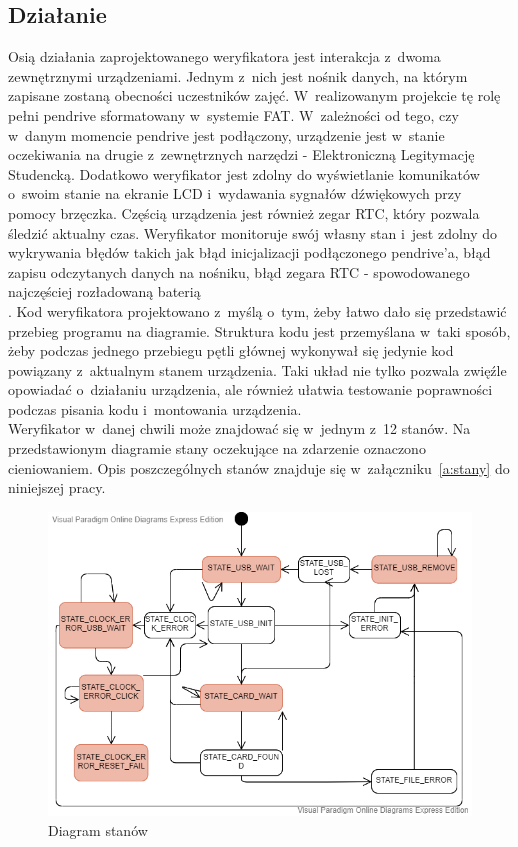 \documentclass[declaration,shortabstract, mgr]{iithesis}
\begin{document}
\subsection{Działanie}
\indent Osią działania zaprojektowanego weryfikatora jest interakcja z~dwoma zewnętrznymi urządzeniami. Jednym z~nich jest nośnik danych, na którym zapisane zostaną obecności uczestników zajęć. W~realizowanym projekcie tę rolę pełni pendrive sformatowany w~systemie FAT. W~zależności od tego, czy w~danym momencie pendrive jest podłączony, urządzenie jest w~stanie oczekiwania na drugie z~zewnętrznych narzędzi - Elektroniczną Legitymację Studencką. Dodatkowo weryfikator jest zdolny do wyświetlanie komunikatów o~swoim stanie na ekranie LCD i~wydawania sygnałów dźwiękowych przy pomocy brzęczka. Częścią urządzenia jest również zegar RTC, który pozwala śledzić aktualny czas. Weryfikator monitoruje swój własny stan i~jest zdolny do wykrywania błędów takich jak błąd inicjalizacji podłączonego pendrive'a, błąd zapisu odczytanych danych na nośniku, błąd zegara RTC - spowodowanego najczęściej rozładowaną baterią\\.
\indent Kod weryfikatora projektowano z~myślą o~tym, żeby łatwo dało się przedstawić przebieg programu na diagramie. Struktura kodu jest przemyślana w~taki sposób, żeby podczas jednego przebiegu pętli głównej wykonywał się jedynie kod powiązany z~aktualnym stanem urządzenia. Taki układ nie tylko pozwala zwięźle opowiadać o~działaniu urządzenia, ale również ułatwia testowanie poprawności podczas pisania kodu i~montowania urządzenia.\\
\indent Weryfikator w~danej chwili może znajdować się w~jednym z~12 stanów. Na przedstawionym diagramie stany oczekujące na zdarzenie oznaczono cieniowaniem. Opis poszczególnych stanów znajduje się w~załączniku~\ref{a:stany} do niniejszej pracy.
\begin{figure}[h]
\caption{Diagram stanów}
\centering
\includegraphics[scale=0.6]{state_machine.png}
\end{figure}
\end{document}
